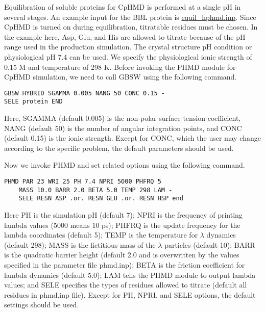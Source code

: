 
Equilibration of soluble proteins for CpHMD is performed at a single pH in several stages. 
An example input for the BBL protein is
\href{https://gitlab.com/shenlab-amber-cphmd/cphmd-tutorial/-/tree/main/hphmd_charmm/bbl_equil_prod}{equil\_hphmd.inp}.
Since CpHMD is turned on during equilibration, titratable residues must be chosen. 
In the example here, Asp, Glu, and His are allowed to titrate because of the pH range used in the production simulation.
The crystal structure pH condition or physiological pH 7.4 can be used.
We specify the physiological ionic strength of 0.15 M and temperature of 298 K.
Before invoking the PHMD module for CpHMD
simulation, we need to call GBSW using the following command.
%
\begin{lstlisting}
GBSW HYBRID SGAMMA 0.005 NANG 50 CONC 0.15 - 
SELE protein END
\end{lstlisting}
%
Here, SGAMMA (default 0.005) is the non-polar surface tension coefficient, NANG (default 50) is the number of angular integration points, and CONC (default 0.15) is the ionic strength.
Except for CONC, which the user may change according to the specific problem, the default parameters should be used.

Now we invoke PHMD and set related options using the following command.
%
\begin{lstlisting}
PHMD PAR 23 WRI 25 PH 7.4 NPRI 5000 PHFRQ 5 
    MASS 10.0 BARR 2.0 BETA 5.0 TEMP 298 LAM -
    SELE RESN ASP .or. RESN GLU .or. RESN HSP end
\end{lstlisting}
%
Here PH is the simulation pH (default 7);
NPRI is the frequency of printing lambda values (5000 means 10 ps);
PHFRQ is the update frequency for the lambda coordinates (default 5);
TEMP is the temperature for $\lambda$ dynamics (default 298);
MASS is the fictitious mass of the $\lambda$ particles (default 10); 
BARR is the quadratic barrier height (default 2.0 and is overwritten by the values specified in the parameter file phmd.inp); 
BETA is the friction coefficient for lambda dynamics (default 5.0); 
LAM tells the PHMD module to output lambda values; and
SELE specifies the types of residues allowed to titrate (default all residues in phmd.inp file). 
Except for PH, NPRI, and SELE options, 
the default settings should be used.

